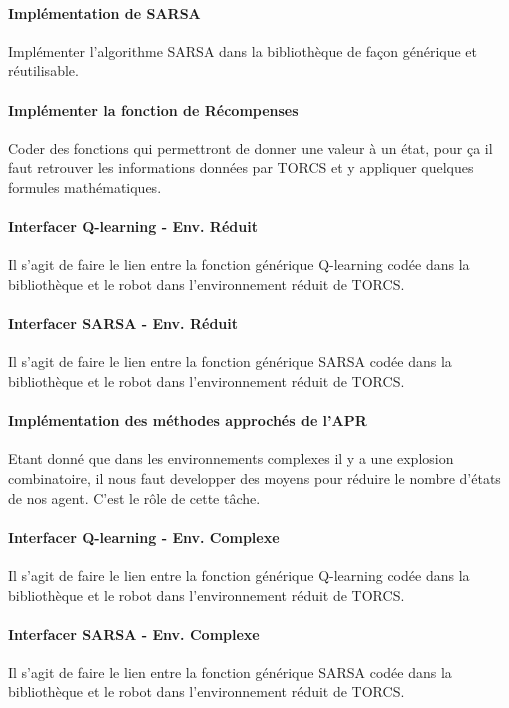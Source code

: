 \documentclass[a4paper,12pt]{article}
\begin{document}
      \paragraph{Implémentation de SARSA} Implémenter l'algorithme SARSA dans la bibliothèque de façon générique
      et réutilisable.
      
      \paragraph{Implémenter la fonction de Récompenses} Coder des fonctions qui permettront de donner une valeur à un état,
      pour ça il faut retrouver les informations données par TORCS et y appliquer quelques formules mathématiques.
      
      \paragraph{Interfacer Q-learning - Env. Réduit} Il s'agit de faire le lien entre la fonction générique Q-learning
      codée dans la bibliothèque et le robot dans l'environnement réduit de TORCS. 
      
      \paragraph{Interfacer SARSA - Env. Réduit} Il s'agit de faire le lien entre la fonction générique SARSA
      codée dans la bibliothèque et le robot dans l'environnement réduit de TORCS. 
      
      \paragraph{Implémentation des méthodes approchés de l'APR} Etant donné que dans les environnements complexes il y a une
      explosion combinatoire, il nous faut developper des moyens pour réduire le nombre d'états de nos agent. C'est le
      rôle de cette tâche.
      
      \paragraph{Interfacer Q-learning - Env. Complexe} Il s'agit de faire le lien entre la fonction générique Q-learning
      codée dans la bibliothèque et le robot dans l'environnement réduit de TORCS. 
      
      \paragraph{Interfacer SARSA - Env. Complexe} Il s'agit de faire le lien entre la fonction générique SARSA
      codée dans la bibliothèque et le robot dans l'environnement réduit de TORCS. 
      
\end{document}
